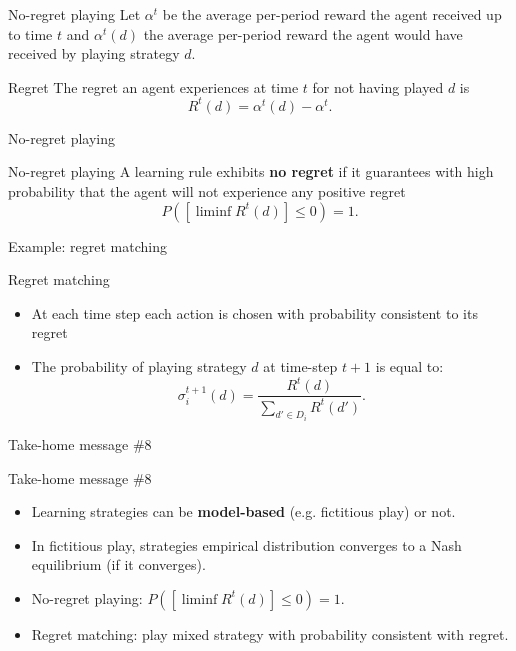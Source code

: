 \begin{frame}{No-regret playing}
    Let $\alpha^t$ be the average per-period reward the agent received up to time $t$
    and $\alpha^t(d)$ the average per-period reward the agent would have received by playing
    strategy $d$. \\
    
    \begin{block}{Regret}
        The regret an agent experiences at time $t$ for not having played $d$ is
        $$R^t(d) = \alpha^t(d) - \alpha^t.$$
    \end{block}
\end{frame}

\begin{frame}{No-regret playing}
    \begin{block}{No-regret playing}
        A learning rule exhibits \textbf{no regret} if it guarantees with high probability that the
        agent will not experience any positive regret
        $$P([\liminf R^t(d)] \leq 0) = 1.$$
    \end{block}
\end{frame}

\begin{frame}{Example: regret matching}
    \begin{block}{Regret matching}
        \begin{itemize}
            \item At each time step each action is chosen with probability consistent to its regret
            \item The probability of playing strategy $d$ at time-step $t+1$ is equal to:
            \[
                \sigma_i^{t+1}(d)= \frac{R^t(d)}{\sum_{d'\in D_i} R^t(d')}.
            \]
        \end{itemize}
    \end{block}
\end{frame}

\begin{frame}{Take-home message \#8}
    \begin{block}{Take-home message \#8}
        \begin{itemize}
            \item Learning strategies can be \textbf{model-based} (e.g. fictitious play) or not.
            \item In fictitious play, {\color{green}strategies empirical distribution converges to a
            Nash equilibrium} (if it converges).
            \item No-regret playing: $P([\liminf R^t(d)] \leq 0) = 1$.
            \item Regret matching: play mixed strategy with probability consistent with regret.
        \end{itemize}
    \end{block}
\end{frame}
